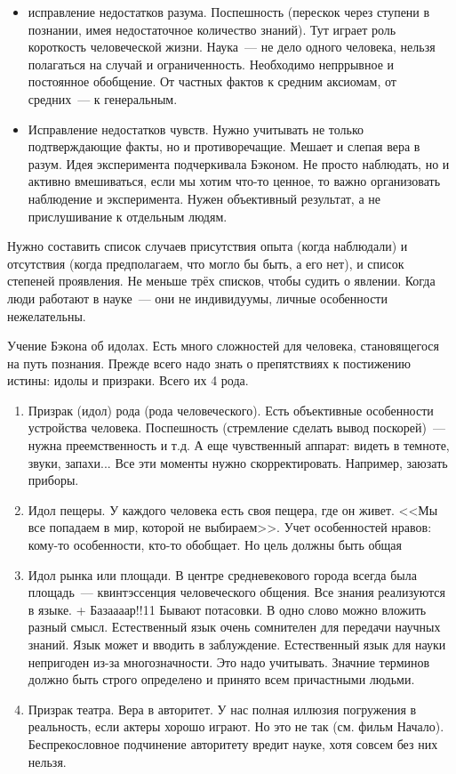 \begin{itemize}
	\item исправление недостатков разума. Поспешность (перескок через ступени в познании, имея недостаточное количество знаний). Тут играет роль короткость человеческой жизни. Наука~--- не дело одного человека, нельзя полагаться на случай и ограниченность. Необходимо непррывное и постоянное обобщение. От частных фактов к средним аксиомам, от средних~--- к генеральным.
	\item Исправление недостатков чувств. Нужно учитывать не только подтверждающие факты, но и противоречащие. Мешает и слепая вера в разум. Идея эксперимента подчеркивала Бэконом. Не просто наблюдать, но и активно вмешиваться, если мы хотим что-то ценное, то важно организовать наблюдение и эксперимента. Нужен объективный результат, а не прислушивание к отдельным людям.
\end{itemize}
Нужно составить список случаев присутствия опыта (когда наблюдали) и отсутствия (когда предполагаем, что могло бы быть, а его нет), и список степеней проявления. Не меньше трёх списков, чтобы судить о явлении. Когда люди работают в науке~--- они не индивидуумы, личные особенности нежелательны.

Учение Бэкона об идолах. Есть много сложностей для человека, становящегося на путь познания. Прежде всего надо знать о препятствиях к постижению истины: идолы и призраки. Всего их 4 рода.

\begin{enumerate}
	\item Призрак (идол) рода (рода человеческого). Есть объективные особенности устройства человека. Поспешность (стремление сделать вывод поскорей)~--- нужна преемственность и т.д. А еще чувственный аппарат: видеть в темноте, звуки, запахи... Все эти моменты нужно скорректировать. Например, заюзать приборы.
	\item Идол пещеры. У каждого человека есть своя пещера, где он живет. <<Мы все попадаем в мир, которой не выбираем>>. Учет особенностей нравов: кому-то особенности, кто-то обобщает. Но цель должны быть общая
	\item Идол рынка или площади. В центре средневекового города всегда была площадь~--- квинтэссенция человеческого общения. Все знания реализуются в языке. + Базаааар!!11 Бывают потасовки. В одно слово можно вложить разный смысл. Естественный язык очень сомнителен для передачи научных знаний. Язык может и вводить в заблуждение. Естественный язык для науки непригоден из-за многозначности. Это надо учитывать. Значние терминов должно быть строго определено и принято всем причастными людьми.
	\item Призрак театра. Вера в авторитет. У нас полная иллюзия погружения в реальность, если актеры хорошо играют. Но это не так (см. фильм Начало). Беспрекословное подчинение авторитету вредит науке, хотя совсем без них нельзя.
\end{enumerate}